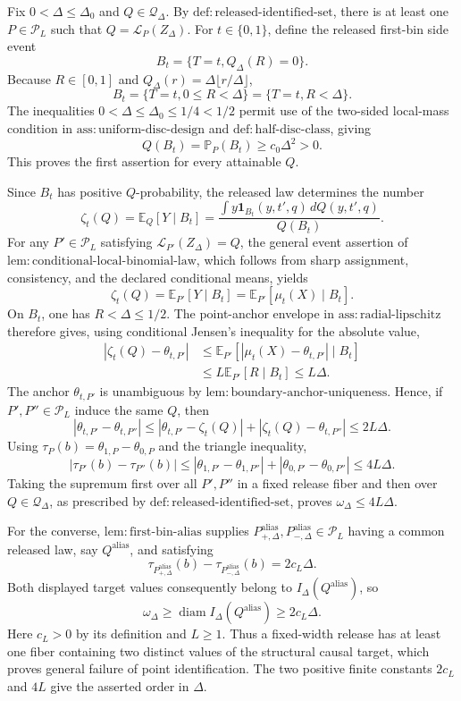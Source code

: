 Fix \(0<\Delta\leq\Delta_0\) and \(Q\in\mathcal Q_\Delta\).  By \(\mathrm{def:released\text{-}identified\text{-}set}\), there is at least one \(P\in\mathcal P_L\) such that \(Q=\mathcal L_P(Z_\Delta)\).  For \(t\in\{0,1\}\), define the released first-bin side event
\[
 B_t=\{T=t,Q_\Delta(R)=0\}.
\]
Because \(R\in[0,1]\) and \(Q_\Delta(r)=\Delta\lfloor r/\Delta\rfloor\),
\[
 B_t=\{T=t,0\leq R<\Delta\}=\{T=t,R<\Delta\}.
\]
The inequalities \(0<\Delta\leq\Delta_0\leq1/4<1/2\) permit use of the two-sided local-mass condition in \(\mathrm{ass:uniform\text{-}disc\text{-}design}\) and \(\mathrm{def:half\text{-}disc\text{-}class}\), giving
\[
 Q(B_t)=\mathbb P_P(B_t)\geq c_0\Delta^2>0.
\]
This proves the first assertion for every attainable \(Q\).

Since \(B_t\) has positive \(Q\)-probability, the released law determines the number
\[
 \zeta_t(Q)=\mathbb E_Q[Y\mid B_t]
 =\frac{\int y\mathbf1_{B_t}(y,t',q)\,dQ(y,t',q)}{Q(B_t)}.
\]
For any \(P'\in\mathcal P_L\) satisfying \(\mathcal L_{P'}(Z_\Delta)=Q\), the general event assertion of \(\mathrm{lem:conditional\text{-}local\text{-}binomial\text{-}law}\), which follows from sharp assignment, consistency, and the declared conditional means, yields
\[
 \zeta_t(Q)=\mathbb E_{P'}[Y\mid B_t]
 =\mathbb E_{P'}[\mu_t(X)\mid B_t].
\]
On \(B_t\), one has \(R<\Delta\leq1/2\).  The point-anchor envelope in \(\mathrm{ass:radial\text{-}lipschitz}\) therefore gives, using conditional Jensen's inequality for the absolute value,
\[
 \begin{aligned}
 |\zeta_t(Q)-\theta_{t,P'}|
 &\leq \mathbb E_{P'}[|\mu_t(X)-\theta_{t,P'}|\mid B_t]\\
 &\leq L\mathbb E_{P'}[R\mid B_t]
 \leq L\Delta.
 \end{aligned}
\]
The anchor \(\theta_{t,P'}\) is unambiguous by \(\mathrm{lem:boundary\text{-}anchor\text{-}uniqueness}\).  Hence, if \(P',P''\in\mathcal P_L\) induce the same \(Q\), then
\[
 |\theta_{t,P'}-\theta_{t,P''}|
 \leq |\theta_{t,P'}-\zeta_t(Q)|+|\zeta_t(Q)-\theta_{t,P''}|
 \leq2L\Delta.
\]
Using \(\tau_P(b)=\theta_{1,P}-\theta_{0,P}\) and the triangle inequality,
\[
 |\tau_{P'}(b)-\tau_{P''}(b)|
 \leq |\theta_{1,P'}-\theta_{1,P''}|+|\theta_{0,P'}-\theta_{0,P''}|
 \leq4L\Delta.
\]
Taking the supremum first over all \(P',P''\) in a fixed release fiber and then over \(Q\in\mathcal Q_\Delta\), as prescribed by \(\mathrm{def:released\text{-}identified\text{-}set}\), proves \(\omega_\Delta\leq4L\Delta\).

For the converse, \(\mathrm{lem:first\text{-}bin\text{-}alias}\) supplies \(P^{\mathrm{alias}}_{+,\Delta},P^{\mathrm{alias}}_{-,\Delta}\in\mathcal P_L\) having a common released law, say \(Q^{\mathrm{alias}}\), and satisfying
\[
 \tau_{P^{\mathrm{alias}}_{+,\Delta}}(b)
 -\tau_{P^{\mathrm{alias}}_{-,\Delta}}(b)=2c_L\Delta.
\]
Both displayed target values consequently belong to \(I_\Delta(Q^{\mathrm{alias}})\), so
\[
 \omega_\Delta
 \geq\operatorname{diam}I_\Delta(Q^{\mathrm{alias}})
 \geq2c_L\Delta.
\]
Here \(c_L>0\) by its definition and \(L\geq1\).  Thus a fixed-width release has at least one fiber containing two distinct values of the structural causal target, which proves general failure of point identification.  The two positive finite constants \(2c_L\) and \(4L\) give the asserted order in \(\Delta\).